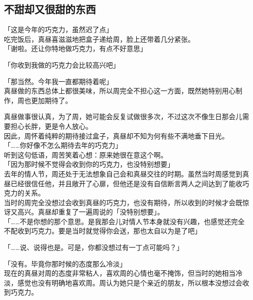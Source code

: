 \subsection{不甜却又很甜的东西}

「这是今年的巧克力，虽然迟了点」\\

吃完饭后，真昼喜滋滋地把盒子递给周，脸上还带着几分紧张。\\

「谢啦。还让你特地做巧克力，有点不好意思」

「你收到我做的巧克力会比较高兴吧」

「那当然。今年我一直都期待着呢」\\

真昼做的东西总体上都很美味，所以周完全不担心这一方面，既然她特别用心制作，周也更加期待了。

真昼做事很认真，为了周，她可能会反复试做很多次，不过这次不像生日那会儿需要担心长胖，更是令人放心。\\

因此，周怀着纯粹的期待接过盒子，真昼却不知为何有些不满地垂下目光。\\

「……你好像不怎么期待去年的巧克力」\\

听到这句低语，周苦笑着心想：原来她很在意这个啊。\\

「因为那时候不觉得会收到你的巧克力，也没特别想要」\\

去年的情人节，周还处于无法想象自己会和真昼交往的时期。虽然当时周感觉到真昼已经很信任他，并且敞开了心扉，但他还是没有自信断言两人之间达到了能收巧克力的关系。\\

当时的周完全没想过会收到真昼的巧克力，也没有期待，所以收到的时候才会既惊讶又高兴。真昼却重复了一遍周说的「没特别想要」。\\

「……不是你想的那个意思。是我那会儿对情人节本身就没有兴趣，也感觉还完全不配收到巧克力。要是当时就觉得你会送，那也太自以为是了吧」

「……说、说得也是。可是，你都没想过有一丁点可能吗？」

「没有。毕竟你那时候的态度那么冷淡」\\

现在的真昼对周的态度非常粘人，喜欢周的心情也毫不掩饰，但当时的她相当冷淡，感觉也没有明确地喜欢周。周认为她只是个亲近的朋友，所以根本没想过会收到巧克力。

